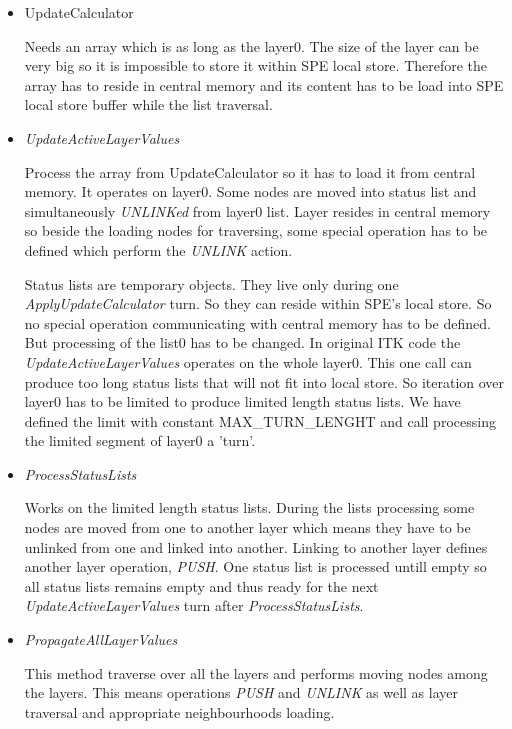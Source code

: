 \begin{itemize}
\item UpdateCalculator
\par
Needs an array which is as long as the layer0.
The size of the layer can be very big so it is impossible to store it within SPE local store.
Therefore the array has to reside in central memory and its content has to be load into SPE local store buffer while the list traversal.

\item \emph{UpdateActiveLayerValues}
\par
Process the array from UpdateCalculator so it has to load it from central memory.
It operates on layer0.
Some nodes are moved into status list and simultaneously \emph{UNLINKed} from layer0 list.
Layer resides in central memory so beside the loading nodes for traversing, some special operation has to be defined which perform the \emph{UNLINK} action.
\par
Status lists are temporary objects. They live only during one \mbox{\emph{ApplyUpdateCalculator}} turn.
So they can reside within SPE's local store.
So no special operation communicating with central memory has to be defined.
But processing of the list0 has to be changed.
In original ITK code the \mbox{\emph{UpdateActiveLayerValues}} operates on the whole layer0.
This one call can produce too long status lists that will not fit into local store.
So iteration over layer0 has to be limited to produce limited length status lists.
We have defined the limit with constant \mbox{MAX\_TURN\_LENGHT} and call processing the limited segment of layer0 a 'turn'.

\item \emph{ProcessStatusLists}
\par
Works on the limited length status lists.
During the lists processing some nodes are moved from one to another layer which means they have to be unlinked from one and linked into another.
Linking to another layer defines another layer operation, \emph{PUSH}.
One status list is processed untill empty so all status lists remains empty and thus ready for the next \emph{UpdateActiveLayerValues} turn after \emph{ProcessStatusLists}.

\item \emph{PropagateAllLayerValues}
\par
This method traverse over all the layers and performs moving nodes among the layers.
This means operations \emph{PUSH} and \emph{UNLINK} as well as layer traversal and appropriate neighbourhoods loading.
\end{itemize}

